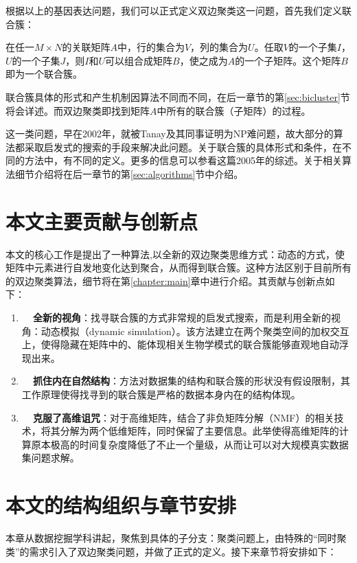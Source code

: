根据以上的基因表达问题，我们可以正式定义双边聚类这一问题，首先我们定义联合簇：
\begin{dingyi}
\label{dingyi:bicluster}
在任一$M\times N$的关联矩阵$A$中，行的集合为$V$，列的集合为$U$。任取$V$的一个子集$I$，$U$的一个子集$J$，则$I$和$U$可以组合成矩阵$B$，使之成为$A$的一个子矩阵。这个矩阵$B$即为一个联合簇。
\end{dingyi}

联合簇具体的形式和产生机制因算法不同而不同，在后一章节的第\ref{sec:bicluster}节将会详述。而双边聚类即找到矩阵$A$中所有的联合簇（子矩阵）的过程。


这一类问题，早在2002年，就被Tanay及其同事证明为NP难问题，故大部分的算法都采取启发式的搜索的手段来解决此问题。关于联合簇的具体形式和条件，在不同的方法中，有不同的定义。更多的信息可以参看这篇2005年的综述。关于相关算法细节介绍将在后一章节的第\ref{sec:algorithms}节中介绍。

\section{本文主要贡献与创新点}
本文的核心工作是提出了一种算法\CoSync{},以全新的双边聚类思维方式：动态的方式，使矩阵中元素进行自发地变化达到聚合，从而得到联合簇。这种方法区别于目前所有的双边聚类算法，细节将在第\ref{chapter:main}章中进行介绍。其贡献与创新点如下：
\begin{enumerate}
  \item \textbf{~~全新的视角}：\CoSync{}找寻联合簇的方式非常规的启发式搜索，而是利用全新的视角：动态模拟（dynamic simulation）。该方法建立在两个聚类空间的加权交互上，使得隐藏在矩阵中的、能体现相关生物学模式的联合簇能够直观地自动浮现出来。
  \item \textbf{~~抓住内在自然结构}：\CoSync{}方法对数据集的结构和联合簇的形状没有假设限制，其工作原理使得找寻到的联合簇是严格的数据本身内在的结构体现。
  \item \textbf{~~克服了高维诅咒}：对于高维矩阵，\CoSync{}结合了非负矩阵分解（NMF）的相关技术，将其分解为两个低维矩阵，同时保留了主要信息。此举使得高维矩阵的计算原本极高的时间复杂度降低了不止一个量级，从而让\CoSync{}可以对大规模真实数据集问题求解。
\end{enumerate}

\section{本文的结构组织与章节安排}
本章从数据挖掘学科讲起，聚焦到具体的子分支：聚类问题上，由特殊的“同时聚类”的需求引入了双边聚类问题，并做了正式的定义。接下来章节将安排如下：

